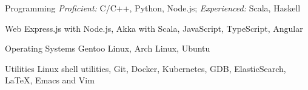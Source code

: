 


\begin{cvskills}


  \cvskill
  {Programming}
  {\textit{Proficient: } C/C++, Python, Node.js; \hspace{0.3cm}
    \textit{Experienced: } Scala, Haskell}


  \cvskill
  {Web}
  {Express.js with Node.js, Akka with Scala, JavaScript, TypeScript, Angular}


  \cvskill
  {Operating Systems}
  {Gentoo Linux, Arch Linux, Ubuntu}

  \cvskill
  {Utilities}
  {Linux shell utilities, Git, Docker,
    Kubernetes, GDB, ElasticSearch, \LaTeX, Emacs and Vim}


\end{cvskills}

